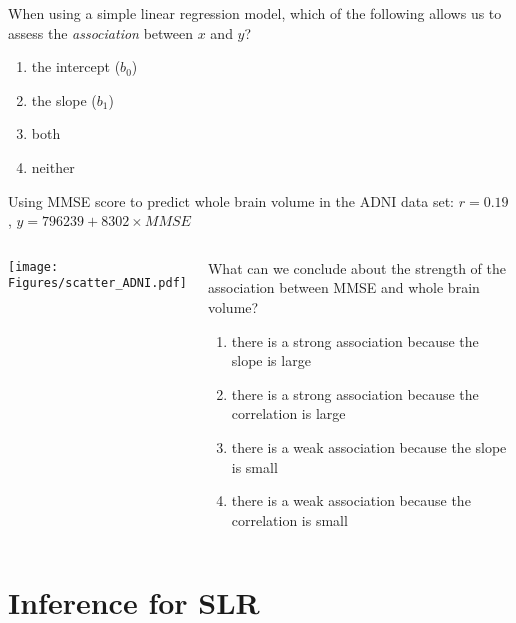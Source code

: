 \begin{frame}
\begin{clicker}{When using a simple linear regression model, which of the following allows us to assess the \emph{association} between $x$ and $y$?}
\begin{enumerate}
    \item
    the intercept ($b_0$)
    \item
     the slope ($b_1$)
     \item
     both
     \item
     neither
\end{enumerate}
\end{clicker}
\end{frame}

\begin{frame}
Using MMSE score to predict whole brain volume in the ADNI data set: $r=0.19$, $\hat{y}=796239+8302\times MMSE$\\
\begin{columns}
\texttt{[image: Figures/scatter\_ADNI.pdf]}
\begin{clicker}{What can we conclude about the strength of the association between MMSE and whole brain volume?}
\begin{enumerate}
    \item
    there is a strong association because the slope is large
    \item
    there is a strong association because the correlation is large
    \item
    there is a weak association because the slope  is small
    \item
    there is a weak association because the correlation is small
\end{enumerate}
\end{clicker}
\end{columns}
\end{frame}

\section[Inference for SLR]{Inference for SLR}
\begin{frame}
\end{frame}

